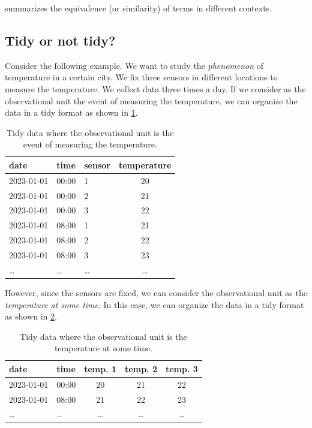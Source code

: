  summarizes the equivalence (or similarity) of terms in different
contexts.

\subsection{Tidy or not tidy?}
\label{sub:tidy-not-tidy}

Consider the following example.  We want to study the \emph{phenomenon} of temperature in a
certain city.  We fix three sensors in different locations to measure the temperature.  We
collect data three times a day.  If we consider as the observational unit the
event of measuring the temperature, we can organize the data in a tidy format as shown in
\cref{tab:temp1}.

\begin{table}
  \centering
  \begin{tabular}{lllc}
    \toprule
    \textbf{date} & \textbf{time} & \textbf{sensor} & \textbf{temperature} \\
    \midrule
    2023-01-01 & 00:00 & 1 & 20 \\
    2023-01-01 & 00:00 & 2 & 21 \\
    2023-01-01 & 00:00 & 3 & 22 \\
    2023-01-01 & 08:00 & 1 & 21 \\
    2023-01-01 & 08:00 & 2 & 22 \\
    2023-01-01 & 08:00 & 3 & 23 \\
    \dots & \dots & \dots & \dots \\
    \bottomrule
  \end{tabular}
  \caption{Tidy data where the observational unit is the event of measuring the temperature.}
  \label{tab:temp1}
\end{table}

However, since the sensors are fixed, we can consider the observational unit as the
\emph{temperature at some time}.  In this case, we can organize the data in a tidy format
as shown in \cref{tab:temp2}.

\begin{table}
  \centering
  \begin{tabular}{llccc}
    \toprule
    \textbf{date} & \textbf{time} & \textbf{temp. 1} & \textbf{temp. 2} & \textbf{temp. 3} \\
    \midrule
    2023-01-01 & 00:00 & 20 & 21 & 22 \\
    2023-01-01 & 08:00 & 21 & 22 & 23 \\
    \dots & \dots & \dots & \dots & \dots \\
    \bottomrule
  \end{tabular}
  \caption{Tidy data where the observational unit is the temperature at some time.}
  \label{tab:temp2}
\end{table}

